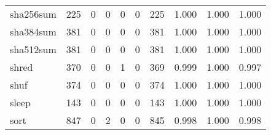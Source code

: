 \begin{longtable}{lp{2.0cm}p{2.0cm}p{2.0cm}p{2.0cm}p{2.0cm}p{2.0cm}p{2.0cm}p{2.0cm}p{2.0cm}}
sha256sum &                    225 &                                  0 &                                 0 &                                0 &                                 0 &                             225 &                                   1.000 &                                  1.000 &                                1.000 \\
sha384sum &                    381 &                                  0 &                                 0 &                                0 &                                 0 &                             381 &                                   1.000 &                                  1.000 &                                1.000 \\
sha512sum &                    381 &                                  0 &                                 0 &                                0 &                                 0 &                             381 &                                   1.000 &                                  1.000 &                                1.000 \\
shred     &                    370 &                                  0 &                                 0 &                                1 &                                 0 &                             369 &                                   0.999 &                                  1.000 &                                0.997 \\
shuf      &                    374 &                                  0 &                                 0 &                                0 &                                 0 &                             374 &                                   1.000 &                                  1.000 &                                1.000 \\
sleep     &                    143 &                                  0 &                                 0 &                                0 &                                 0 &                             143 &                                   1.000 &                                  1.000 &                                1.000 \\
sort      &                    847 &                                  0 &                                 2 &                                0 &                                 0 &                             845 &                                   0.998 &                                  1.000 &                                0.998 \\

\end{longtable}
